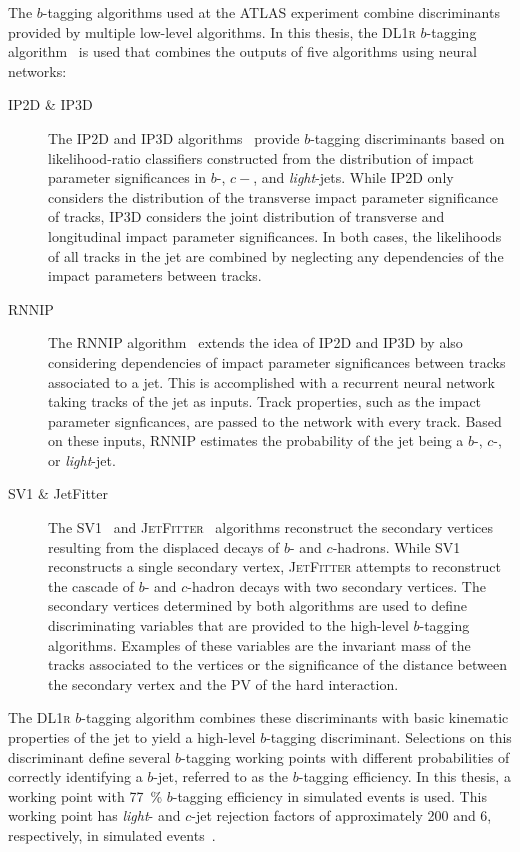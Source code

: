 The $b$-tagging algorithms used at the ATLAS experiment combine discriminants
provided by multiple low-level algorithms. In this thesis, the \textsc{DL1r}
$b$-tagging algorithm~\cite{FTAG-2019-07-001} is used that combines the outputs
of five algorithms using neural networks:
\begin{description}

\item[IP2D \& IP3D] The \textsc{IP2D} and \textsc{IP3D}
  algorithms~\cite{ATL-PHYS-PUB-2017-013} provide $b$-tagging discriminants
  based on likelihood-ratio classifiers constructed from the distribution of
  impact parameter significances in $b$-, $c-$, and \emph{light}-jets. While
  \textsc{IP2D} only considers the distribution of the transverse impact
  parameter significance of tracks, \textsc{IP3D} considers the joint
  distribution of transverse and longitudinal impact parameter significances.
  In both cases, the likelihoods of all tracks in the jet are combined by
  neglecting any dependencies of the impact parameters between tracks.

\item[RNNIP] The \textsc{RNNIP} algorithm~\cite{ATL-PHYS-PUB-2017-003} extends
  the idea of \textsc{IP2D} and \textsc{IP3D} by also considering dependencies
  of impact parameter significances between tracks associated to a jet. This is
  accomplished with a recurrent neural network taking tracks of the jet as
  inputs. Track properties, such as the impact parameter signficances, are
  passed to the network with every track. Based on these inputs, \textsc{RNNIP}
  estimates the probability of the jet being a $b$-, $c$-, or \emph{light}-jet.

\item[SV1 \& JetFitter] The \textsc{SV1}~\cite{ATL-PHYS-PUB-2017-011} and
  \textsc{JetFitter}~\cite{ATL-PHYS-PUB-2018-025} algorithms reconstruct the
  secondary vertices resulting from the displaced decays of $b$- and
  $c$-hadrons. While \textsc{SV1} reconstructs a single secondary vertex,
  \textsc{JetFitter} attempts to reconstruct the cascade of $b$- and $c$-hadron
  decays with two secondary vertices. The secondary vertices determined by both
  algorithms are used to define discriminating variables that are provided to
  the high-level $b$-tagging algorithms. Examples of these variables are the
  invariant mass of the tracks associated to the vertices or the significance of
  the distance between the secondary vertex and the PV of the hard interaction.

\end{description}
The \textsc{DL1r} $b$-tagging algorithm combines these discriminants with basic
kinematic properties of the jet to yield a high-level $b$-tagging discriminant.
Selections on this discriminant define several $b$-tagging working points with
different probabilities of correctly identifying a $b$-jet, referred to as the
$b$-tagging efficiency. In this thesis, a working point with \SI{77}{\percent}
$b$-tagging efficiency in simulated \ttbar events is used. This working point
has \emph{light}- and $c$-jet rejection factors of approximately 200 and 6,
respectively, in simulated \ttbar events~\cite{FTAG-2019-07-001}.


